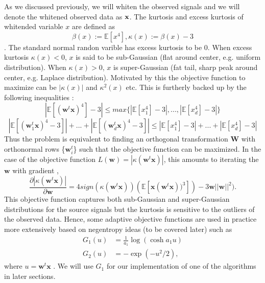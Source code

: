 \documentclass[aps,prl,preprint,superscriptaddress]{revtex4-2}
\begin{document}
As we discussed previously, we will whiten the observed signals and we will denote the whitened observed data as $\bf{x}$. The kurtosis and excess kurtosis of whitended variable $x$ are defined as $$ \beta(x) := \mathbb{E}[x^{4}], \kappa(x) := \beta(x)-3 $$. The standard normal randon varible has excess kurtosis to be 0. When excess kurtosis $\kappa(x) < 0$, $x$ is said to be sub-Gaussian (flat around center, e.g. uniform distribution). When $\kappa(x) > 0$, $x$ is super-Gaussian (fat tail, sharp peak around center, e.g. Laplace distribution). Motivated by this the objective function to maximize can be $|\kappa(x)|$ and $\kappa^{2}(x)$ etc. This is furtherly backed up by the following inequalities \cite{miettinen2015fourth}: 
\begin{equation}
|\mathbb{E}[(\mathbf{w}^{t}\mathbf{x})^{4}]-3| \leq max\{|\mathbb{E}[x_{1}^{4}]-3|,...,|\mathbb{E}[x_{d}^{4}]-3|\}
\end{equation}
\begin{equation}
|\mathbb{E}[(\mathbf{w}_{1}^{t}\mathbf{x})^{4}-3]|+...+|\mathbb{E}[(\mathbf{w}_{d}^{t}\mathbf{x})^{4}-3]| \leq |\mathbb{E}[x_{1}^{4}]-3|+...+|\mathbb{E}[x_{d}^{4}]-3|
\end{equation}
Thus the problem is equivalent to finding an orthogonal transformation $\mathbf{W}$ with orthonormal rows \{$\mathbf{w}_{i}^{t}$\} such that the objective function can be maximized. In the case of the objective function $L(\mathbf{w}) = |\kappa(\mathbf{w}^{t}\mathbf{x})|$, this amounts to iterating the $\mathbf{w}$ with gradient \citep{hyvarinen2000independent},
\begin{equation}
\frac{\partial |\kappa(\mathbf{w}^{t}\mathbf{x})|}{\partial \mathbf{w}} = 4 sign(\kappa(\mathbf{w}^{t}\mathbf{x}))(\mathbb{E}[\mathbf{x}(\mathbf{w}^{t}\mathbf{x}))^{3}])-3\mathbf{w}||\mathbf{w}||^{2}).
\end{equation} 
This objective function captures both sub-Gaussian and super-Gaussian distributions for the source signals but the kurtosis is sensitive to the outliers of the observed data. Hence, some adaptive objective functions are used in practice more extensively based on negentropy ideas (to be covered later) such as \begin{align}
G_{1}(u) &= \frac{1}{a_{1}}\log(\cosh a_{1}u) \\
G_{2}(u) &= -\exp(-u^{2}/2), 
\end{align} where $u = \mathbf{w}^{t}\mathbf{x}$ \citep{hyvarinen2000independent}. We will use $G_{1}$ for our implementation of one of the algorithms in later sections. 
\end{document}
